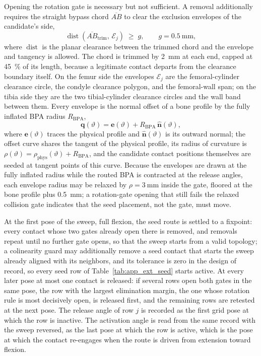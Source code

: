 Opening the rotation gate is necessary but not sufficient. A removal additionally requires the straight bypass chord $\overline{AB}$ to clear the exclusion envelopes of the candidate's side,
\begin{equation}
\operatorname{dist}\!\left(\overline{AB}_{\mathrm{trim}},\, \mathcal{E}_{j}\right) \;\geq\; g, \qquad g = \qty{0.5}{\mm},
\label{eq:app_bypass_gate}
\end{equation}
where $\operatorname{dist}$ is the planar clearance between the trimmed chord and the envelope and tangency is allowed. The chord is trimmed by \qty{2}{\mm} at each end, capped at \qty{45}{\percent} of its length, because a legitimate contact departs from the clearance boundary itself. On the femur side the envelopes $\mathcal{E}_{j}$ are the femoral-cylinder clearance circle, the condyle clearance polygon, and the femoral-wall span; on the tibia side they are the two tibial-cylinder clearance circles and the wall band between them. Every envelope is the normal offset of a bone profile by the fully inflated BPA radius $R_{\mathrm{BPA}}$,
\begin{equation}
\mathbf{q}(\vartheta) = \mathbf{e}(\vartheta) + R_{\mathrm{BPA}}\,\hat{\mathbf{n}}(\vartheta),
\label{eq:app_offset_curve}
\end{equation}
where $\mathbf{e}(\vartheta)$ traces the physical profile and $\hat{\mathbf{n}}(\vartheta)$ is its outward normal; the offset curve shares the tangent of the physical profile, its radius of curvature is $\rho(\vartheta) = \rho_{\mathrm{phys}}(\vartheta) + R_{\mathrm{BPA}}$, and the candidate contact positions themselves are seeded at tangent points of this curve. Because the envelopes are drawn at the fully inflated radius while the routed BPA is contracted at the release angles, each envelope radius may be relaxed by $\rho = \qty{3}{\mm}$ inside the gate, floored at the bone profile plus \qty{0.5}{\mm}; a rotation-gate opening that still fails the relaxed collision gate indicates that the seed placement, not the gate, must move.

At the first pose of the sweep, full flexion, the seed route is settled to a fixpoint: every contact whose two gates already open there is removed, and removals repeat until no further gate opens, so that the sweep starts from a valid topology; a colinearity guard may additionally remove a seed contact that starts the sweep already aligned with its neighbors, and its tolerance is zero in the design of record, so every seed row of Table~\ref{tab:app_ext_seed} starts active. At every later pose at most one contact is released: if several rows open both gates in the same pose, the row with the largest elimination margin, the one whose rotation rule is most decisively open, is released first, and the remaining rows are retested at the next pose. The release angle of row $j$ is recorded as the first grid pose at which the row is inactive. The activation angle is read from the same record with the sweep reversed, as the last pose at which the row is active, which is the pose at which the contact re-engages when the route is driven from extension toward flexion.

